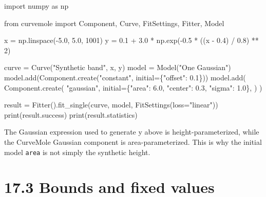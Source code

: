 \documentclass[
  10pt,
  a4paper,
  oneside]{scrreprt}
\newenvironment{Shaded}{}{}
\newcommand{\BuiltInTok}[1]{#1}
\newcommand{\DecValTok}[1]{\textcolor[rgb]{0.25,0.63,0.44}{#1}}
\newcommand{\FloatTok}[1]{\textcolor[rgb]{0.25,0.63,0.44}{#1}}
\newcommand{\ImportTok}[1]{#1}
\newcommand{\NormalTok}[1]{#1}
\newcommand{\OperatorTok}[1]{\textcolor[rgb]{0.40,0.40,0.40}{#1}}
\newcommand{\StringTok}[1]{\textcolor[rgb]{0.25,0.44,0.63}{#1}}
\begin{document}
\begin{Shaded}
\begin{Highlighting}[]
\ImportTok{import}\NormalTok{ numpy }\ImportTok{as}\NormalTok{ np}

\ImportTok{from}\NormalTok{ curvemole }\ImportTok{import}\NormalTok{ Component, Curve, FitSettings, Fitter, Model}

\NormalTok{x }\OperatorTok{=}\NormalTok{ np.linspace(}\OperatorTok{{-}}\FloatTok{5.0}\NormalTok{, }\FloatTok{5.0}\NormalTok{, }\DecValTok{1001}\NormalTok{)}
\NormalTok{y }\OperatorTok{=} \FloatTok{0.1} \OperatorTok{+} \FloatTok{3.0} \OperatorTok{*}\NormalTok{ np.exp(}\OperatorTok{{-}}\FloatTok{0.5} \OperatorTok{*}\NormalTok{ ((x }\OperatorTok{{-}} \FloatTok{0.4}\NormalTok{) }\OperatorTok{/} \FloatTok{0.8}\NormalTok{) }\OperatorTok{**} \DecValTok{2}\NormalTok{)}

\NormalTok{curve }\OperatorTok{=}\NormalTok{ Curve(}\StringTok{"Synthetic band"}\NormalTok{, x, y)}
\NormalTok{model }\OperatorTok{=}\NormalTok{ Model(}\StringTok{"One Gaussian"}\NormalTok{)}
\NormalTok{model.add(Component.create(}\StringTok{"constant"}\NormalTok{, initial}\OperatorTok{=}\NormalTok{\{}\StringTok{"offset"}\NormalTok{: }\FloatTok{0.1}\NormalTok{\}))}
\NormalTok{model.add(}
\NormalTok{    Component.create(}
        \StringTok{"gaussian"}\NormalTok{,}
\NormalTok{        initial}\OperatorTok{=}\NormalTok{\{}\StringTok{"area"}\NormalTok{: }\FloatTok{6.0}\NormalTok{, }\StringTok{"center"}\NormalTok{: }\FloatTok{0.3}\NormalTok{, }\StringTok{"sigma"}\NormalTok{: }\FloatTok{1.0}\NormalTok{\},}
\NormalTok{    )}
\NormalTok{)}

\NormalTok{result }\OperatorTok{=}\NormalTok{ Fitter().fit\_single(curve, model, FitSettings(loss}\OperatorTok{=}\StringTok{"linear"}\NormalTok{))}
\BuiltInTok{print}\NormalTok{(result.success)}
\BuiltInTok{print}\NormalTok{(result.statistics)}
\end{Highlighting}
\end{Shaded}

The Gaussian expression used to generate y above is
height-parameterized, while the CurveMole Gaussian component is
area-parameterized. This is why the initial model \texttt{area} is not
simply the synthetic height.

\hypertarget{bounds-and-fixed-values}{%
\section{17.3 Bounds and fixed values}\label{bounds-and-fixed-values}}
\end{document}
